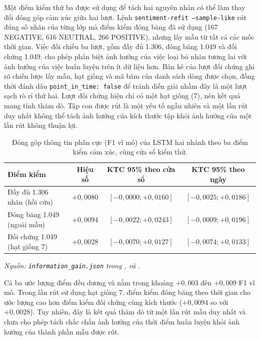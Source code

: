 \documentclass[12pt, a4paper, oneside]{report}
\begin{document}
Một điểm kiểm thứ ba được sử dụng để tách hai nguyên nhân có thể làm thay đổi đóng góp cảm xúc giữa
hai lượt. Lệnh \texttt{sentiment-refit --sample-like} rút đúng số nhãn của từng lớp mà
điểm kiểm đóng băng đã sử dụng (167 NEGATIVE, 616 NEUTRAL, 266 POSITIVE), nhưng lấy mẫu từ
tất cả các mốc thời gian. Việc đối chiếu ba lượt, gồm đầy đủ 1.306, đóng băng 1.049 và đối
chứng 1.049, cho phép phân biệt ảnh hưởng của việc loại bỏ nhãn tương lai với ảnh
hưởng của việc huấn luyện trên ít dữ liệu hơn. Bản kê của lượt đối chứng ghi rõ
chiến lược lấy mẫu, hạt giống và mã băm của danh sách dòng được chọn, đồng thời đánh dấu
\texttt{point\_in\_time: false} để tránh diễn giải nhầm đây là một lượt sạch rò rỉ thứ
hai. Lượt đối chứng hiện chỉ có một hạt giống (7), nên kết quả mang tính thăm dò. Tập con
được rút là một yếu tố ngẫu nhiên và một lần rút duy nhất không thể tách ảnh hưởng
của kích thước tập khỏi ảnh hưởng của một lần rút không thuận lợi.

\begin{table}[H]
  \centering
  \caption{Đóng góp thông tin phân cực (F1 vĩ mô) của LSTM hai nhánh theo ba điểm kiểm cảm xúc, cùng cửa sổ kiểm thử.}
  \label{tab:kq-pit}
  \begin{tabular}{l c c c}
    \toprule
    Điểm kiểm & Hiệu số & KTC 95\% theo cửa sổ & KTC 95\% theo ngày \\
    \midrule
    Đầy đủ 1.306 nhãn (hồi cứu) & $+0{,}0080$ & $[-0{,}0000; +0{,}0160]$ & $[-0{,}0025; +0{,}0186]$ \\
    Đóng băng 1.049 (ngoài mẫu) & $+0{,}0094$ & $[-0{,}0022; +0{,}0243]$ & $[-0{,}0009; +0{,}0196]$ \\
    Đối chứng 1.049 (hạt giống 7) & $+0{,}0028$ & $[-0{,}0070; +0{,}0127]$ & $[-0{,}0074; +0{,}0133]$ \\
    \bottomrule
  \end{tabular}
\noindent\textit{Nguồn: \texttt{information\_gain.json} trong ,  và .}
\end{table}

Cả ba ước lượng điểm đều dương và nằm trong khoảng $+0{,}003$ đến $+0{,}009$ F1 vĩ mô. Trong
lần rút sử dụng hạt giống 7, điểm kiểm đóng băng theo thời gian cho ước lượng cao hơn điểm kiểm
đối chứng cùng kích thước ($+0{,}0094$ so với $+0{,}0028$). Tuy nhiên, đây là kết quả thăm dò từ một
lần rút mẫu duy nhất và chưa cho phép tách chắc chắn ảnh hưởng của thời điểm huấn luyện khỏi ảnh hưởng của
thành phần mẫu được rút.
\end{document}

